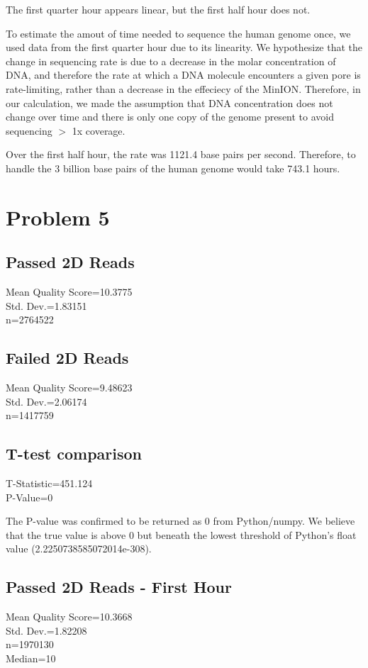 \documentclass[11pt]{article}
\begin{document}
The first quarter hour appears linear, but the first half hour does not.

To estimate the amout of time needed to sequence the human genome once, 
we used data from the first quarter hour due to its linearity.  We hypothesize 
that the change in sequencing rate is due to a decrease in the molar concentration 
of DNA, and therefore the rate at which a DNA molecule encounters a given pore is 
rate-limiting, rather than a decrease in the effeciecy of the MinION.  Therefore, 
in our calculation, we made the assumption that DNA concentration does not change 
over time and there is only one copy of the genome present to avoid sequencing 
$>$ 1x coverage. 


Over the first half hour, the rate was 1121.4 base pairs per second.  Therefore, to handle the 3 billion base pairs of the human genome would take 743.1 hours.
\section*{Problem 5}
\subsection*{Passed 2D Reads}
Mean Quality Score=10.3775\\  Std. Dev.=1.83151\\ n=2764522\\

\subsection*{Failed 2D Reads}
Mean Quality Score=9.48623\\  Std. Dev.=2.06174\\ n=1417759\\

\subsection*{T-test comparison}
T-Statistic=451.124\\
P-Value=0


The P-value was confirmed to be returned as 0 from Python/numpy.
We believe that the true value is above 0 but beneath the lowest threshold of Python's float value (2.2250738585072014e-308).

\subsection*{Passed 2D Reads - First Hour}
Mean Quality Score=10.3668\\  Std. Dev.=1.82208\\ n=1970130\\
Median=10
\end{document}
